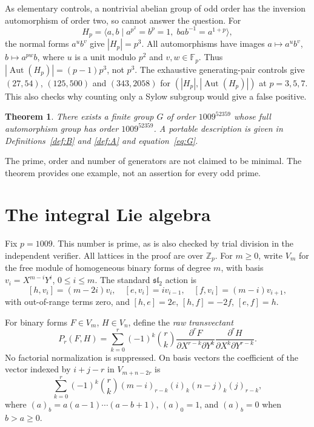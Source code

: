 \documentclass[11pt]{article}
\newtheorem{theorem}{Theorem}[section]
\theoremstyle{definition}\newtheorem{definition}[theorem]{Definition}
\theoremstyle{remark}\newtheorem{remark}[theorem]{Remark}
\DeclareMathOperator{\Aut}{Aut}
\newcommand{\Zp}{\mathbb Z_p}
\newcommand{\Fp}{\mathbb F_p}
\begin{document}
As elementary controls, a nontrivial abelian group of odd order has the
inversion automorphism of order two, so cannot answer the question. For
\[
 H_p=\langle a,b\mid a^{p^2}=b^p=1,\;bab^{-1}=a^{1+p}\rangle,
\]
the normal forms $a^u b^v$ give $|H_p|=p^3$. All automorphisms have images
$a\mapsto a^u b^v$, $b\mapsto a^{pw}b$, where $u$ is a unit modulo $p^2$
and $v,w\in\Fp$. Thus $|\Aut(H_p)|=(p-1)p^3$, not $p^3$.
The exhaustive generating-pair controls give $(27,54)$, $(125,500)$ and
$(343,2058)$ for $(|H_p|,|\Aut(H_p)|)$ at $p=3,5,7$.
This also checks why counting only a Sylow subgroup would give a false positive.

\begin{theorem}\label{thm:main}
There exists a finite group $G$ of order $1009^{52359}$ whose full automorphism
group has order $1009^{52359}$. A portable description is given in
Definitions~\ref{def:B} and \ref{def:A} and equation~\eqref{eq:G}.
\end{theorem}
The prime, order and number of generators are not claimed to be minimal.
The theorem provides one example, not an assertion for every odd prime.

\section{The integral Lie algebra}
Fix $p=1009$. This number is prime, as is also checked by trial division in
the independent verifier. All lattices in the proof are over $\Zp$.
For $m\ge0$, write $V_m$ for the free module of homogeneous binary forms of
degree $m$, with basis $v_i=X^{m-i}Y^i$, $0\le i\le m$.
The standard $\mathfrak{sl}_2$ action is
\begin{equation}\label{eq:action}
 [h,v_i]=(m-2i)v_i,\quad [e,v_i]=i v_{i-1},\quad
 [f,v_i]=(m-i)v_{i+1},
\end{equation}
with out-of-range terms zero, and
$[h,e]=2e$, $[h,f]=-2f$, $[e,f]=h$.

For binary forms $F\in V_m$, $H\in V_n$, define the \emph{raw transvectant}
\begin{equation}\label{eq:transvectant}
 P_r(F,H)=\sum_{k=0}^r(-1)^k\binom rk
 \frac{\partial^r F}{\partial X^{r-k}\partial Y^k}
 \frac{\partial^r H}{\partial X^k\partial Y^{r-k}}.
\end{equation}
No factorial normalization is suppressed. On basis vectors the coefficient
of the vector indexed by $i+j-r$ in $V_{m+n-2r}$ is
\begin{equation}\label{eq:falling}
 \sum_{k=0}^r(-1)^k\binom rk
 (m-i)_{r-k}(i)_k(n-j)_k(j)_{r-k},
\end{equation}
where $(a)_b=a(a-1)\cdots(a-b+1)$, $(a)_0=1$, and $(a)_b=0$ when $b>a\ge0$.
\end{document}
